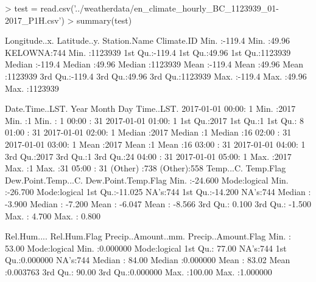 \documentclass[11pt, a4paper]{article}
\begin{document}
\begin{Schunk}
\begin{Sinput}
> test = read.csv('../weatherdata/en_climate_hourly_BC_1123939_01-2017_P1H.csv')
> summary(test)
\end{Sinput}
\begin{Soutput}
 Longitude..x.     Latitude..y.    Station.Name   Climate.ID     
 Min.   :-119.4   Min.   :49.96   KELOWNA:744   Min.   :1123939  
 1st Qu.:-119.4   1st Qu.:49.96                 1st Qu.:1123939  
 Median :-119.4   Median :49.96                 Median :1123939  
 Mean   :-119.4   Mean   :49.96                 Mean   :1123939  
 3rd Qu.:-119.4   3rd Qu.:49.96                 3rd Qu.:1123939  
 Max.   :-119.4   Max.   :49.96                 Max.   :1123939  
                                                                 
         Date.Time..LST.      Year          Month        Day       Time..LST. 
 2017-01-01 00:00:  1    Min.   :2017   Min.   :1   Min.   : 1   00:00  : 31  
 2017-01-01 01:00:  1    1st Qu.:2017   1st Qu.:1   1st Qu.: 8   01:00  : 31  
 2017-01-01 02:00:  1    Median :2017   Median :1   Median :16   02:00  : 31  
 2017-01-01 03:00:  1    Mean   :2017   Mean   :1   Mean   :16   03:00  : 31  
 2017-01-01 04:00:  1    3rd Qu.:2017   3rd Qu.:1   3rd Qu.:24   04:00  : 31  
 2017-01-01 05:00:  1    Max.   :2017   Max.   :1   Max.   :31   05:00  : 31  
 (Other)         :738                                            (Other):558  
   Temp...C.       Temp.Flag      Dew.Point.Temp...C. Dew.Point.Temp.Flag
 Min.   :-24.600   Mode:logical   Min.   :-26.700     Mode:logical       
 1st Qu.:-11.025   NA's:744       1st Qu.:-14.200     NA's:744           
 Median : -3.900                  Median : -7.200                        
 Mean   : -6.047                  Mean   : -8.566                        
 3rd Qu.:  0.100                  3rd Qu.: -1.500                        
 Max.   :  4.700                  Max.   :  0.800                        
                                                                         
  Rel.Hum....     Rel.Hum.Flag   Precip..Amount..mm. Precip..Amount.Flag
 Min.   : 53.00   Mode:logical   Min.   :0.000000    Mode:logical       
 1st Qu.: 77.00   NA's:744       1st Qu.:0.000000    NA's:744           
 Median : 84.00                  Median :0.000000                       
 Mean   : 83.02                  Mean   :0.003763                       
 3rd Qu.: 90.00                  3rd Qu.:0.000000                       
 Max.   :100.00                  Max.   :1.000000                       
                                                                        

\end{Soutput}
\end{Schunk}
\end{document}
